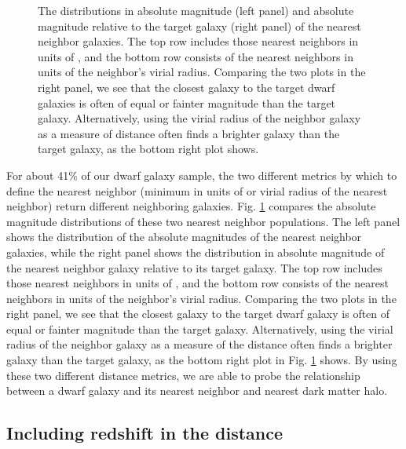 \begin{figure}
    \caption[Distribution of absolute magnitudes of nearest neighbors]{The 
    distributions in absolute magnitude (left panel) and absolute magnitude 
    relative to the target galaxy (right panel) of the nearest neighbor 
    galaxies.  The top row includes those nearest neighbors in units of \hMpc, 
    and the bottom row consists of the nearest neighbors in units of the 
    neighbor's virial radius.  Comparing the two plots in the right panel, we 
    see that the closest galaxy to the target dwarf galaxies is often of equal 
    or fainter magnitude than the target galaxy.  Alternatively, using the 
    virial radius of the neighbor galaxy as a measure of distance often finds a 
    brighter galaxy than the target galaxy, as the bottom right plot shows.}
    \label{fig:Mr_dist}
\end{figure}

For about 41\% of our dwarf galaxy sample, the two different metrics by which to 
define the nearest neighbor (minimum in units of \hMpc or virial radius of the 
nearest neighbor) return different neighboring galaxies.  Fig. \ref{fig:Mr_dist} 
compares the absolute magnitude distributions of these two nearest neighbor 
populations.  The left panel shows the distribution of the absolute magnitudes 
of the nearest neighbor galaxies, while the right panel shows the distribution 
in absolute magnitude of the nearest neighbor galaxy relative to its target 
galaxy.  The top row includes those nearest neighbors in units of \hMpc, and the 
bottom row consists of the nearest neighbors in units of the neighbor's virial 
radius.  Comparing the two plots in the right panel, we see that the closest 
galaxy to the target dwarf galaxy is often of equal or fainter magnitude than 
the target galaxy.  Alternatively, using the virial radius of the neighbor 
galaxy as a measure of the distance often finds a brighter galaxy than the 
target galaxy, as the bottom right plot in Fig. \ref{fig:Mr_dist} shows.  By 
using these two different distance metrics, we are able to probe the 
relationship between a dwarf galaxy and its nearest neighbor and nearest dark 
matter halo.


\subsection{Including redshift in the distance}


